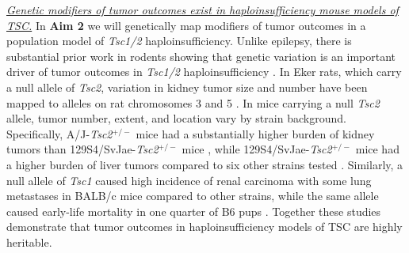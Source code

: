 \documentclass[
  12pt,
]{article}
\begin{document}
\textit{\underline{Genetic modifiers of tumor outcomes exist in haploinsufficiency mouse models of TSC.}}
In \textbf{Aim 2} we will genetically map modifiers of tumor outcomes in
a population model of \textit{Tsc1/2} haploinsufficiency. Unlike
epilepsy, there is substantial prior work in rodents showing that
genetic variation is an important driver of tumor outcomes in
\textit{Tsc1/2} haploinsufficiency \cite{20235887}. In Eker rats, which
carry a null allele of \textit{Tsc2}, variation in kidney tumor size and
number have been mapped to alleles on rat chromosomes 3 \cite{11735216}
and 5 \cite{14654943}. In mice carrying a null \textit{Tsc2} allele,
tumor number, extent, and location vary by strain background.
Specifically, A/J-\textit{Tsc2}\(^{+/-}\) mice had a substantially
higher burden of kidney tumors than 129S4/SvJae-\textit{Tsc2}\(^{+/-}\)
mice \cite{10491404}, while 129S4/SvJae-\textit{Tsc2}\(^{+/-}\) mice had
a higher burden of liver tumors compared to six other strains tested
\cite{20235887}. Similarly, a null allele of \textit{Tsc1} caused high
incidence of renal carcinoma with some lung metastases in BALB/c mice
compared to other strains, while the same allele caused early-life
mortality in one quarter of B6 pups \cite{15888477}. Together these
studies demonstrate that tumor outcomes in haploinsufficiency models of
TSC are highly heritable.
\end{document}
